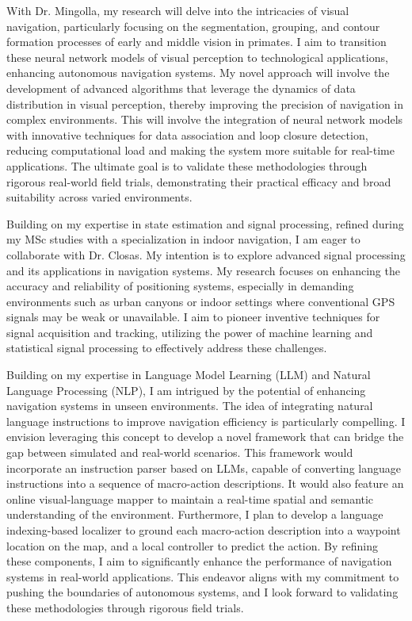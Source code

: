\documentclass[a4,20pt]{article}
\begin{document}
\begin{large}
With Dr. Mingolla, my research will delve into the intricacies of visual navigation, particularly focusing on the segmentation, grouping, and contour formation processes of early and middle vision in primates. I aim to transition these neural network models of visual perception to technological applications, enhancing autonomous navigation systems. My novel approach will involve the development of advanced algorithms that leverage the dynamics of data distribution in visual perception, thereby improving the precision of navigation in complex environments. This will involve the integration of neural network models with innovative techniques for data association and loop closure detection, reducing computational load and making the system more suitable for real-time applications. The ultimate goal is to validate these methodologies through rigorous real-world field trials, demonstrating their practical efficacy and broad suitability across varied environments.

Building on my expertise in state estimation and signal processing, refined during my MSc studies with a specialization in indoor navigation, I am eager to collaborate with Dr. Closas. My intention is to explore advanced signal processing and its applications in navigation systems. My research focuses on enhancing the accuracy and reliability of positioning systems, especially in demanding environments such as urban canyons or indoor settings where conventional GPS signals may be weak or unavailable. I aim to pioneer inventive techniques for signal acquisition and tracking, utilizing the power of machine learning and statistical signal processing to effectively address these challenges.



Building on my expertise in Language Model Learning (LLM) and Natural Language Processing (NLP), I am intrigued by the potential of enhancing navigation systems in unseen environments. The idea of integrating natural language instructions to improve navigation efficiency is particularly compelling. I envision leveraging this concept to develop a novel framework that can bridge the gap between simulated and real-world scenarios. This framework would incorporate an instruction parser based on LLMs, capable of converting language instructions into a sequence of macro-action descriptions. It would also feature an online visual-language mapper to maintain a real-time spatial and semantic understanding of the environment. Furthermore, I plan to develop a language indexing-based localizer to ground each macro-action description into a waypoint location on the map, and a local controller to predict the action. By refining these components, I aim to significantly enhance the performance of navigation systems in real-world applications. This endeavor aligns with my commitment to pushing the boundaries of autonomous systems, and I look forward to validating these methodologies through rigorous field trials.



\end{large}
\end{document}
